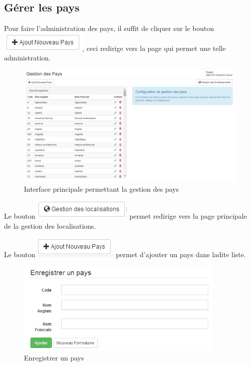 \documentclass[12pt,a4paper]{report}
\begin{document}
\subsection{Gérer les pays}
Pour faire l'administration des pays, il suffit de cliquer sur le bouton \includegraphics[scale=0.7]{pic/AddNewCountry.png}, ceci redirige vers la page qui permet une telle administration.
\begin{figure}[h]
\begin{center}
\includegraphics[width=14cm]{pic/AdminCountry.png}
\end{center}
\caption{Interface principale permettant la gestion des pays}
\label{Interface principale permettant la gestion des pays}
\end{figure}

Le bouton \includegraphics[scale=0.7]{pic/GestionEmplacement.png}  permet redirige vers la page principale de la gestion des localisations.

Le bouton \includegraphics[scale=0.7]{pic/AddCountry.png} permet d'ajouter un pays dans ladite liste.

\begin{figure}[h]
\begin{center}
\includegraphics[width=10cm]{pic/SaveCountry.png}
\end{center}
\caption{Enregistrer un pays}
\label{Enregistrer un pays}
\end{figure}
\end{document}
